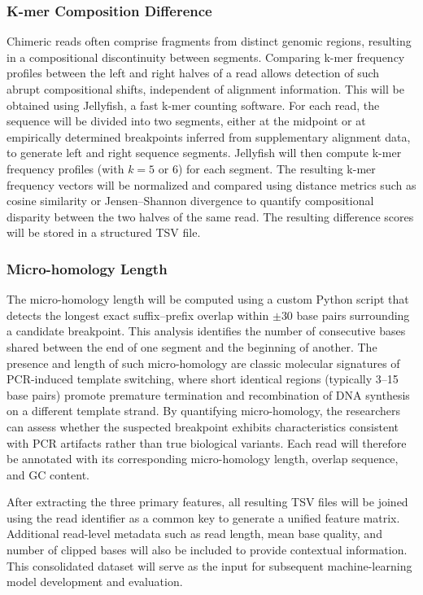 \subsubsection{K-mer Composition Difference}
Chimeric reads often comprise fragments from distinct genomic regions, resulting in a compositional discontinuity between segments. Comparing k-mer frequency profiles between the left and right halves of a read allows detection of such abrupt compositional shifts, independent of alignment information. This will be obtained using Jellyfish, a fast k-mer counting software. For each read, the sequence will be divided into two segments, either at the midpoint or at empirically determined breakpoints inferred from supplementary alignment data, to generate left and right sequence segments. Jellyfish will then compute k-mer frequency profiles (with $k = 5$ or $6$) for each segment. The resulting k-mer frequency vectors will be normalized and compared using distance metrics such as cosine similarity or Jensen–Shannon divergence to quantify compositional disparity between the two halves of the same read. The resulting difference scores will be stored in a structured TSV file.

\subsubsection{Micro-homology Length}
The micro-homology length will be computed using a custom Python script that detects the longest exact suffix–prefix overlap within $\pm 30$ base pairs surrounding a candidate breakpoint. This analysis identifies the number of consecutive bases shared between the end of one segment and the beginning of another. The presence and length of such micro-homology are classic molecular signatures of PCR-induced template switching, where short identical regions (typically 3–15 base pairs) promote premature termination and recombination of DNA synthesis on a different template strand. By quantifying micro-homology, the researchers can assess whether the suspected breakpoint exhibits characteristics consistent with PCR artifacts rather than true biological variants. Each read will therefore be annotated with its corresponding micro-homology length, overlap sequence, and GC content.

After extracting the three primary features, all resulting TSV files will be joined using the read identifier as a common key to generate a unified feature matrix. Additional read-level metadata such as read length, mean base quality, and number of clipped bases will also be included to provide contextual information. This consolidated dataset will serve as the input for subsequent machine-learning model development and evaluation.

